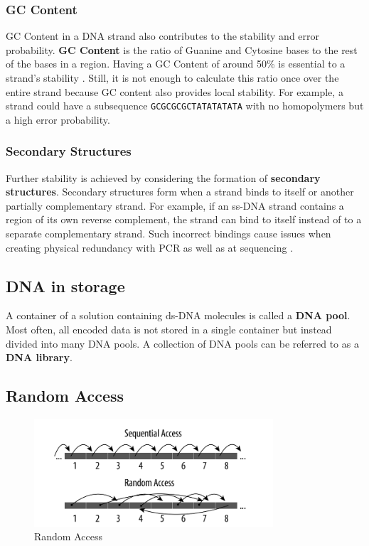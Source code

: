 \documentclass[a4paper,conference]{IEEEtran}
\begin{document}
\subsubsection{GC Content}
GC Content in a DNA strand also contributes to the stability and error probability.  \textbf{GC Content} is the ratio of Guanine and Cytosine bases to the rest of the bases in a region. Having a GC Content of around 50\% is essential to a strand's stability \cite{gccontent}. Still, it is not enough to calculate this ratio once over the entire strand because GC content also provides local stability. For example, a strand could have a subsequence \texttt{GCGCGCGCTATATATATA} with no homopolymers but a high error probability.


\subsubsection{Secondary Structures}
Further stability is achieved by considering the formation of \textbf{secondary structures}. Secondary structures form when a strand binds to itself or another partially complementary strand. For example, if an ss-DNA strand contains a region of its own reverse complement, the strand can bind to itself instead of to a separate complementary strand. Such incorrect bindings cause issues when creating physical redundancy with PCR \cite{pcr} as well as at sequencing \cite{secondarystructures}.


\subsection{DNA in storage}
A container of a solution containing ds-DNA molecules is called a \textbf{DNA pool}. Most often, all encoded data is not stored in a single container but instead divided into many DNA pools. A collection of DNA pools can be referred to as a \textbf{DNA library}. 

\subsection{Random Access}
\begin{figure}
\centering
\includegraphics[width=3.5in]{randomaccess}
\caption{Random Access}
\label{randomaccess}
\end{figure}
\end{document}
